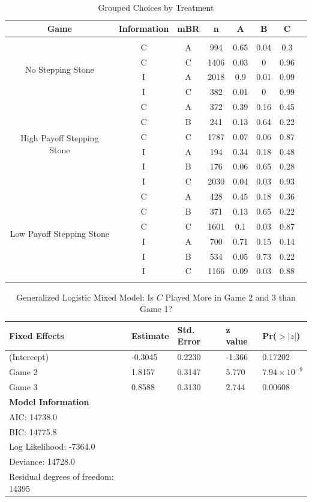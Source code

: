 \begin{table}[h] \centering 
  \caption{Grouped Choices by Treatment}
  \label{tab:groupedchoicetreat} 
\begin{tabular}{@{\extracolsep{5pt}} cccccccc} 
\Xhline{.1em}
Game & Information & mBR & n & A & B & C \\ 
\hline \\[-1.8ex] 
\multirow{4}{8em}{No Stepping Stone}& C & A & 994 & 0.65 & 0.04 & 0.3 \\ 
 & C & C & 1406 & 0.03 & 0 & 0.96 \\ 
 & I & A & 2018 & 0.9 & 0.01 & 0.09 \\ 
& I & C & 382 & 0.01 & 0 & 0.99 \\ 
\multirow{6}{8em}{High Payoff Stepping Stone} & C & A & 372 & 0.39 & 0.16 & 0.45 \\ 
& C & B & 241 & 0.13 & 0.64 & 0.22 \\ 
& C & C & 1787 & 0.07 & 0.06 & 0.87 \\ 
& I & A & 194 & 0.34 & 0.18 & 0.48 \\ 
 & I & B & 176 & 0.06 & 0.65 & 0.28 \\ 
 & I & C & 2030 & 0.04 & 0.03 & 0.93 \\ 
\multirow{6}{8em}{Low Payoff Stepping Stone} & C & A & 428 & 0.45 & 0.18 & 0.36 \\ 
 & C & B & 371 & 0.13 & 0.65 & 0.22 \\ 
& C & C & 1601 & 0.1 & 0.03 & 0.87 \\ 
& I & A & 700 & 0.71 & 0.15 & 0.14 \\ 
 & I & B & 534 & 0.05 & 0.73 & 0.22 \\ 
 & I & C & 1166 & 0.09 & 0.03 & 0.88 \\ 
\hline \\[-1.8ex] 
\end{tabular} 
\end{table} 

\begin{table}[!htbp]
\caption{Generalized Logistic Mixed Model: Is $C$ Played More in Game 2 and 3 than Game 1?}
\label{regression:logit1} 
\centering
\begin{tabular}{lllll}
\hline
\textbf{Fixed Effects} & \textbf{Estimate} & \textbf{Std. Error} & \textbf{z value} & \textbf{Pr($>|z|$)} \\
\hline
(Intercept) & -0.3045 & 0.2230 & -1.366 & 0.17202 \\
Game 2 & 1.8157 & 0.3147 & 5.770 & $7.94 \times 10^{-9}$ \\
Game 3 & 0.8588 & 0.3130 & 2.744 & 0.00608 \\
\hline
\multicolumn{5}{l}{\textbf{Model Information}} \\
\hline
AIC: 14738.0 \\
BIC: 14775.8 \\
Log Likelihood: -7364.0 \\
Deviance: 14728.0 \\
Residual degrees of freedom: 14395 \\
\hline
\end{tabular}
\end{table}

